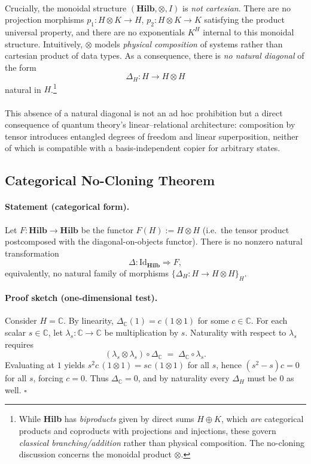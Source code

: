\documentclass[11pt]{article}
\theoremstyle{upright}
\begin{document}
\paragraph{}
Crucially, the monoidal structure $(\textbf{Hilb}, \otimes, I)$ is \emph{not cartesian}. There are no projection morphisms $p_1:H\otimes K \to H$, $p_2:H\otimes K \to K$ satisfying the product universal property, and there are no exponentials $K^H$ internal to this monoidal structure. Intuitively, $\otimes$ models \emph{physical composition} of systems rather than cartesian product of data types. As a consequence, there is \emph{no natural diagonal} of the form
\begin{equation}\label{eq:natural-diag}
\Delta_H : H \longrightarrow H \otimes H
\end{equation}
natural in $H$.\footnote{While \textbf{Hilb} has \emph{biproducts} given by direct sums $H \oplus K$, which \emph{are} categorical products and coproducts with projections and injections, these govern \emph{classical branching/addition} rather than physical composition. The no-cloning discussion concerns the monoidal product $\otimes$.}

\paragraph{}
This absence of a natural diagonal is not an ad hoc prohibition but a direct consequence of quantum theory's linear--relational architecture: composition by tensor introduces entangled degrees of freedom and linear superposition, neither of which is compatible with a basis-independent copier for arbitrary states.

\subsection{Categorical No-Cloning Theorem}

\paragraph{Statement (categorical form).}
Let $F:\mathbf{Hilb}\to\mathbf{Hilb}$ be the functor $F(H):=H\otimes H$ (i.e.\ the tensor product postcomposed with the diagonal-on-objects functor). There is no nonzero natural transformation
\[
\Delta : \mathrm{Id}_{\mathbf{Hilb}} \Rightarrow F,
\]
equivalently, no natural family of morphisms $\{\Delta_H : H \to H\otimes H\}_H$.

\paragraph{Proof sketch (one-dimensional test).}
Consider $H=\mathbb{C}$. By linearity, $\Delta_{\mathbb{C}}(1) = c\, (1\otimes 1)$ for some $c\in \mathbb{C}$. For each scalar $s\in\mathbb{C}$, let $\lambda_s:\mathbb{C}\to\mathbb{C}$ be multiplication by $s$. Naturality with respect to $\lambda_s$ requires
\[
(\lambda_s \otimes \lambda_s)\circ \Delta_{\mathbb{C}} \;=\; \Delta_{\mathbb{C}} \circ \lambda_s.
\]
Evaluating at $1$ yields $s^2 c\,(1\otimes 1) = s c\,(1\otimes 1)$ for all $s$, hence $(s^2 - s)c = 0$ for all $s$, forcing $c=0$. Thus $\Delta_{\mathbb{C}}=0$, and by naturality every $\Delta_H$ must be $0$ as well. $\square$
\end{document}
